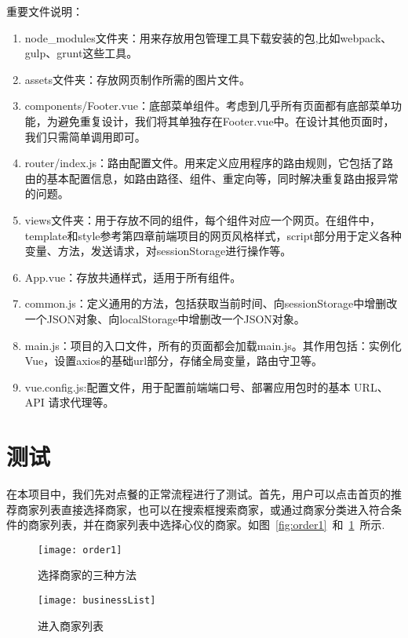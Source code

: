 重要文件说明：
\begin{enumerate}
    \item {node\_modules文件夹}：用来存放用包管理工具下载安装的包,比如webpack、gulp、grunt这些工具。
    \item {assets文件夹}：存放网页制作所需的图片文件。
    \item {components/Footer.vue}：底部菜单组件。考虑到几乎所有页面都有底部菜单功能，为避免重复设计，我们将其单独存在Footer.vue中。在设计其他页面时，我们只需简单调用即可。
    \item {router/index.js}：路由配置文件。用来定义应用程序的路由规则，它包括了路由的基本配置信息，如路由路径、组件、重定向等，同时解决重复路由报异常的问题。
    \item {views文件夹}：用于存放不同的组件，每个组件对应一个网页。在组件中，template和style参考第四章前端项目的网页风格样式，script部分用于定义各种变量、方法，发送请求，对sessionStorage进行操作等。
    \item {App.vue}：存放共通样式，适用于所有组件。
    \item {common.js}：定义通用的方法，包括获取当前时间、向sessionStorage中增删改一个JSON对象、向localStorage中增删改一个JSON对象。
    \item {main.js}：项目的入口文件，所有的页面都会加载main.js。其作用包括：实例化Vue，设置axios的基础url部分，存储全局变量，路由守卫等。
    \item {vue.config.js}:配置文件，用于配置前端端口号、部署应用包时的基本 URL、API 请求代理等。
\end{enumerate}

\section{测试}
在本项目中，我们先对点餐的正常流程进行了测试。首先，用户可以点击首页的推荐商家列表直接选择商家，也可以在搜索框搜索商家，或通过商家分类进入符合条件的商家列表，并在商家列表中选择心仪的商家。如图~\ref{fig:order1}~和~\ref{fig:businessList}~所示.
\begin{figure}[htbp]
    \centering
    \begin{minipage}{0.4\textwidth}
        \centering
        \texttt{[image: order1]}
        \caption{选择商家的三种方法}\label{fig:order1}
    \end{minipage}
    \begin{minipage}{0.4\textwidth}
        \centering
        \texttt{[image: businessList]}
        \caption{进入商家列表}\label{fig:businessList}
    \end{minipage}
    \vspace{\baselineskip}
\end{figure}

